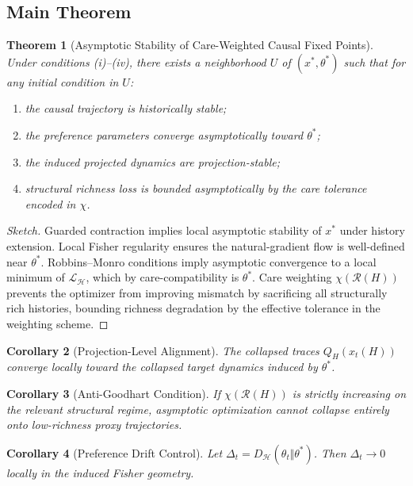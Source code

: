 \documentclass[11pt,a4paper]{article}
\newtheorem{theorem}{Theorem}[section]
\newtheorem{corollary}[theorem]{Corollary}
\theoremstyle{definition}
\theoremstyle{remark}
\begin{document}
\subsection{Main Theorem}

\begin{theorem}[Asymptotic Stability of Care-Weighted Causal Fixed Points]
Under conditions \textrm{(i)--(iv)}, there exists a neighborhood $U$ of $(x^\ast, \theta^\ast)$ such that for any initial condition in $U$:
\begin{enumerate}
\item the causal trajectory is historically stable;
\item the preference parameters converge asymptotically toward $\theta^\ast$;
\item the induced projected dynamics are projection-stable;
\item structural richness loss is bounded asymptotically by the care tolerance encoded in $\chi$.
\end{enumerate}
\end{theorem}

\begin{proof}[Sketch]
Guarded contraction implies local asymptotic stability of $x^\ast$ under history extension. Local Fisher regularity ensures the natural-gradient flow is well-defined near $\theta^\ast$. Robbins--Monro conditions imply asymptotic convergence to a local minimum of $\mathcal{L}_{\mathcal{H}}$, which by care-compatibility is $\theta^\ast$. Care weighting $\chi(\mathcal{R}(H))$ prevents the optimizer from improving mismatch by sacrificing all structurally rich histories, bounding richness degradation by the effective tolerance in the weighting scheme.
\end{proof}

\begin{corollary}[Projection-Level Alignment]
The collapsed traces $Q_H(x_t(H))$ converge locally toward the collapsed target dynamics induced by $\theta^\ast$.
\end{corollary}

\begin{corollary}[Anti-Goodhart Condition]
If $\chi(\mathcal{R}(H))$ is strictly increasing on the relevant structural regime, asymptotic optimization cannot collapse entirely onto low-richness proxy trajectories.
\end{corollary}

\begin{corollary}[Preference Drift Control]
Let $\Delta_t = D_{\mathcal{H}}(\theta_t \Vert \theta^\ast)$. Then $\Delta_t \to 0$ locally in the induced Fisher geometry.
\end{corollary}
\end{document}
